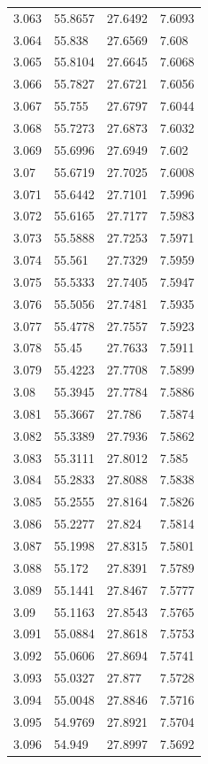 \begin{tabular}{llll}
3.063 & 55.8657 & 27.6492 & 7.6093 \\
3.064 & 55.838 & 27.6569 & 7.608 \\
3.065 & 55.8104 & 27.6645 & 7.6068 \\
3.066 & 55.7827 & 27.6721 & 7.6056 \\
3.067 & 55.755 & 27.6797 & 7.6044 \\
3.068 & 55.7273 & 27.6873 & 7.6032 \\
3.069 & 55.6996 & 27.6949 & 7.602 \\
3.07 & 55.6719 & 27.7025 & 7.6008 \\
3.071 & 55.6442 & 27.7101 & 7.5996 \\
3.072 & 55.6165 & 27.7177 & 7.5983 \\
3.073 & 55.5888 & 27.7253 & 7.5971 \\
3.074 & 55.561 & 27.7329 & 7.5959 \\
3.075 & 55.5333 & 27.7405 & 7.5947 \\
3.076 & 55.5056 & 27.7481 & 7.5935 \\
3.077 & 55.4778 & 27.7557 & 7.5923 \\
3.078 & 55.45 & 27.7633 & 7.5911 \\
3.079 & 55.4223 & 27.7708 & 7.5899 \\
3.08 & 55.3945 & 27.7784 & 7.5886 \\
3.081 & 55.3667 & 27.786 & 7.5874 \\
3.082 & 55.3389 & 27.7936 & 7.5862 \\
3.083 & 55.3111 & 27.8012 & 7.585 \\
3.084 & 55.2833 & 27.8088 & 7.5838 \\
3.085 & 55.2555 & 27.8164 & 7.5826 \\
3.086 & 55.2277 & 27.824 & 7.5814 \\
3.087 & 55.1998 & 27.8315 & 7.5801 \\
3.088 & 55.172 & 27.8391 & 7.5789 \\
3.089 & 55.1441 & 27.8467 & 7.5777 \\
3.09 & 55.1163 & 27.8543 & 7.5765 \\
3.091 & 55.0884 & 27.8618 & 7.5753 \\
3.092 & 55.0606 & 27.8694 & 7.5741 \\
3.093 & 55.0327 & 27.877 & 7.5728 \\
3.094 & 55.0048 & 27.8846 & 7.5716 \\
3.095 & 54.9769 & 27.8921 & 7.5704 \\
3.096 & 54.949 & 27.8997 & 7.5692 \\

\end{tabular}
